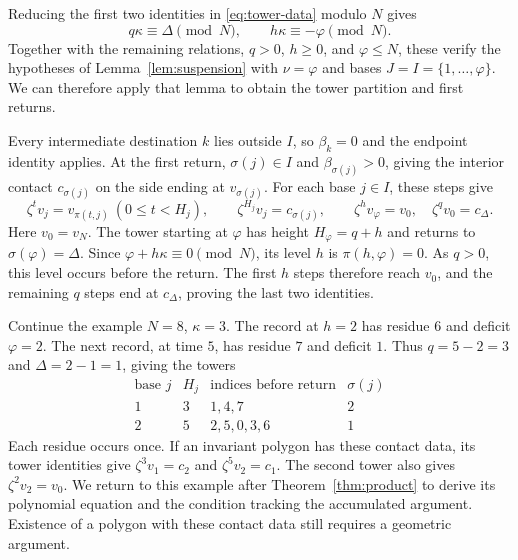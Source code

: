 \documentclass[11pt,a4paper]{article}
\theoremstyle{definition}
\theoremstyle{remark}
\numberwithin{equation}{section}
\begin{document}
Reducing the first two identities in \eqref{eq:tower-data} modulo $N$ gives
\[
 q\kappa\equiv\Delta\pmod N,\qquad h\kappa\equiv-\varphi\pmod N.
\]
Together with the remaining relations, $q>0$, $h\ge0$, and $\varphi\le N$, these verify the hypotheses of Lemma~\ref{lem:suspension} with $\nu=\varphi$ and bases $J=I=\{1,\ldots,\varphi\}$. We can therefore apply that lemma to obtain the tower partition and first returns.

Every intermediate destination $k$ lies outside $I$, so $\beta_k=0$ and the endpoint identity applies. At the first return, $\sigma(j)\in I$ and $\beta_{\sigma(j)}>0$, giving the interior contact $c_{\sigma(j)}$ on the side ending at $v_{\sigma(j)}$. For each base $j\in I$, these steps give
\begin{equation}\label{eq:towers}
 \zeta^t v_j=v_{\pi(t,j)}\ (0\le t<H_j),\qquad
 \zeta^{H_j}v_j=c_{\sigma(j)},\qquad
 \zeta^h v_\varphi=v_0,\quad \zeta^qv_0=c_\Delta.
\end{equation}
Here $v_0=v_N$. The tower starting at $\varphi$ has height $H_\varphi=q+h$ and returns to $\sigma(\varphi)=\Delta$. Since $\varphi+h\kappa\equiv0\pmod N$, its level $h$ is $\pi(h,\varphi)=0$. As $q>0$, this level occurs before the return. The first $h$ steps therefore reach $v_0$, and the remaining $q$ steps end at $c_\Delta$, proving the last two identities.

Continue the example $N=8$, $\kappa=3$. The record at $h=2$ has residue $6$ and deficit $\varphi=2$. The next record, at time $5$, has residue $7$ and deficit $1$. Thus $q=5-2=3$ and $\Delta=2-1=1$, giving the towers
\[
\begin{array}{c|c|c|c}
\text{base }j&H_j&\text{indices before return}&\sigma(j)\\ \hline
1&3&1,4,7&2\\
2&5&2,5,0,3,6&1
\end{array}
\]
Each residue occurs once. If an invariant polygon has these contact data, its tower identities give $\zeta^3v_1=c_2$ and $\zeta^5v_2=c_1$. The second tower also gives $\zeta^2v_2=v_0$. We return to this example after Theorem~\ref{thm:product} to derive its polynomial equation and the condition tracking the accumulated argument. Existence of a polygon with these contact data still requires a geometric argument.
\end{document}
